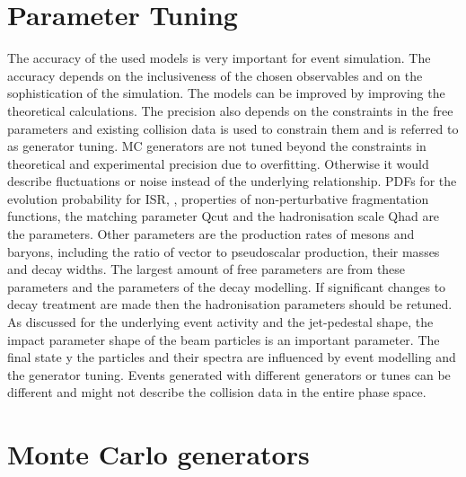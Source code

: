 \section{Parameter Tuning}

The accuracy of the used models is very important for event simulation. The accuracy depends on the inclusiveness of the chosen observables and on the sophistication of the simulation. The models can be improved by improving the theoretical calculations. The precision also depends on the constraints in the free parameters and existing collision data is used to constrain them and is referred to as generator tuning. MC generators are not tuned beyond the constraints in theoretical and experimental precision due to overfitting. Otherwise it would describe fluctuations or noise instead of the underlying relationship. PDFs for the evolution probability for ISR, \as, properties of non-perturbative fragmentation functions, the matching parameter Qcut and the hadronisation scale Qhad are the parameters. Other parameters are the production rates of mesons and baryons, including the ratio of vector to pseudoscalar production, their masses and decay widths. The largest amount of free parameters are from these parameters and the parameters of the decay modelling. If significant changes to decay treatment are made then the hadronisation parameters should be retuned. As discussed for the underlying event activity and the jet-pedestal shape, the impact parameter shape of the beam particles is an important parameter. The final state y the particles and their spectra are influenced by event modelling and the generator tuning. Events generated with different generators or tunes can be different and might not describe the collision data in the entire phase space.


\section{Monte Carlo generators}

